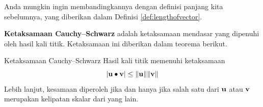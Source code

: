 Anda mungkin ingin membandingkannya dengan definisi panjang kita sebelumnya,
yang diberikan dalam Definisi \ref{def:lengthofvector}.

\textbf{Ketaksamaan Cauchy--Schwarz} adalah ketaksamaan mendasar yang dipenuhi oleh hasil kali titik.
 Ketaksamaan ini diberikan dalam teorema berikut.

\begin{theorem}{Ketaksamaan Cauchy--Schwarz}\label{thm:cauchyschwarzinequality}
Hasil kali titik memenuhi ketaksamaan
\begin{equation}
\left\vert \mathbf{u}\bullet \mathbf{v}\right\vert \leq \| \mathbf{u}\| \| \mathbf{v}\|   \label{cauchy}
\end{equation}
Lebih lanjut, kesamaan diperoleh jika dan hanya jika salah satu dari $\mathbf{u}$ atau $\mathbf{v}$ merupakan kelipatan skalar dari yang lain.
\end{theorem}


